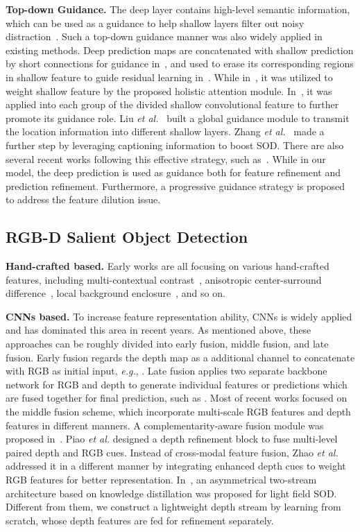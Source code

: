 \documentclass[runningheads]{llncs}
\begin{document}
\textbf{Top-down Guidance.} The deep layer contains high-level semantic information, which can be used as a guidance to help shallow layers filter out noisy distraction~\cite{chen2020cyb}. Such a top-down guidance manner was also widely applied in existing methods. Deep prediction maps are concatenated with shallow prediction by short connections for guidance in~\cite{hou2019deeply}, and used to erase its corresponding regions in shallow feature to guide residual learning in~\cite{chen2018reverse}. While in~\cite{wu2019cascaded}, it was utilized to weight shallow feature by the proposed holistic attention module. In~\cite{liu2019deep}, it was applied into each group of the divided shallow convolutional feature to further promote its guidance role. Liu \textit{et al.}~\cite{liu2019simple} built a global guidance module to transmit the location information into different shallow layers. Zhang \textit{et al.}~\cite{zhang2019capsal} made a further step by leveraging captioning
information to boost SOD. There are also several recent works following this effective strategy, such as~\cite{zhao2019egnet}\cite{pang2020multi}\cite{zhang2020weakly}. While in our model, the deep prediction is used as guidance both for feature refinement and prediction refinement. Furthermore, a progressive guidance strategy is proposed to address the feature dilution issue.

\subsection{RGB-D Salient Object Detection}
\textbf{Hand-crafted based.} Early works are all focusing on various hand-crafted features, including multi-contextual contrast~\cite{peng2014rgbd}, anisotropic center-surround difference~\cite{ju2014depth}, local background enclosure~\cite{feng2016local}, and so on.

\textbf{CNNs based.} To increase feature representation ability, CNNs is widely applied and has dominated this area in recent years. As mentioned above, these approaches can be roughly divided into early fusion, middle fusion, and late fusion. Early fusion regards the depth map as a additional channel to concatenate with RGB as initial input, \textit{e.g.}, \cite{song2017depth}. Late fusion applies two separate backbone network for RGB and depth to generate individual features or predictions which are fused together for final prediction, such as \cite{han2017cnns}\cite{fan2019rethinking}. Most of recent works focused on the middle fusion scheme, which incorporate multi-scale RGB features and depth features in different manners. A complementarity-aware fusion module was proposed in~\cite{chen2018progressively}. Piao \textit{et al.} \cite{piao2019depth} designed a depth refinement block to fuse multi-level paired depth and RGB cues. Instead of cross-modal feature fusion, Zhao \textit{et al.} \cite{zhao2019contrast} addressed it in a different manner by integrating enhanced depth cues to weight RGB features for better representation. In~\cite{piao2020exploit}, an asymmetrical two-stream architecture based on knowledge distillation was proposed for light field SOD. Different from them, we construct a lightweight depth stream by learning from scratch, whose depth features are fed for refinement separately.
\end{document}

